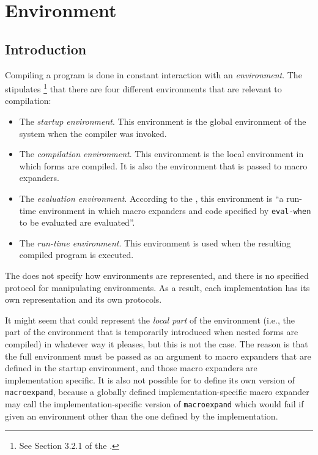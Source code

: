 \chapter{Environment}
\label{chap-environment}

\section{Introduction}

Compiling a \cl{} program is done in constant interaction with an
\emph{environment}.  The \hs{} stipulates%
\footnote{See Section 3.2.1 of the \hs{}.}
that there are four different environments that are relevant to
compilation:

\begin{itemize}
\item The \emph{startup environment}.  This environment is the global
  environment of the \cl{} system when the compiler was invoked.
\item The \emph{compilation environment}.  This environment is the
  local environment in which forms are compiled.  It is also the
  environment that is passed to macro expanders.
\item The \emph{evaluation environment}.  According to the \hs{}, this
  environment is ``a run-time environment in which macro expanders and
  code specified by \texttt{eval-when} to be evaluated are
  evaluated''. 
\item The \emph{run-time environment}.  This environment is used when
  the resulting compiled program is executed.
\end{itemize}

The \hs{} does not specify how environments are represented, and there
is no specified protocol for manipulating environments.  As a result,
each implementation has its own representation and its own protocols. 

It might seem that \sysname{} could represent the \emph{local part} of
the environment (i.e., the part of the environment that is temporarily
introduced when nested forms are compiled) in whatever way it pleases,
but this is not the case.  The reason is that the full environment
must be passed as an argument to macro expanders that are defined in
the startup environment, and those macro expanders are implementation
specific.  It is also not possible for \sysname{} to define its own
version of \texttt{macroexpand}, because a globally defined
implementation-specific macro expander may call the
implementation-specific version of \texttt{macroexpand} which would
fail if given an environment other than the one defined by the
implementation. 

